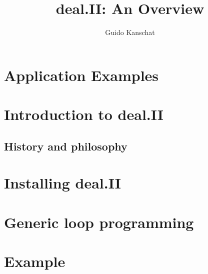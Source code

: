 \documentclass{beamer}
\title[deal.II Overview]{deal.II: An Overview}
\author[Guido Kanschat]{Guido Kanschat}
\institute[IWR, Uni Heidelberg]{IWR, Universität Heidelberg\\[2mm]
\texttt{[image: iwr]}
\hfill
\texttt{[image: dealclover]}
\hfill
\texttt{[image: unihd]}
}
\begin{document}
\begin{frame}[plain]
  \titlepage    
\end{frame}

\section{Application Examples}


\section{Introduction to deal.II}
\subsection{History and philosophy}



\section[Installing]{Installing deal.II}


\section[Installing]{Generic loop programming}


\section{Example}

\end{document}
